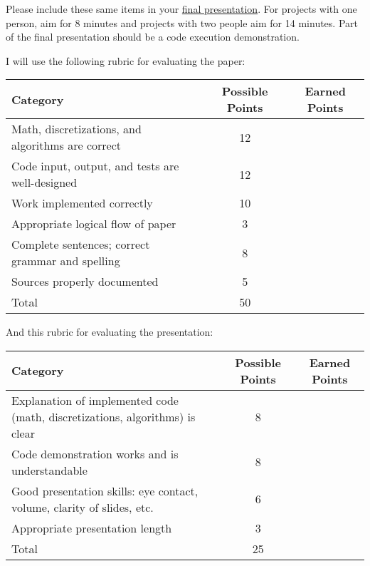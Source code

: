 \documentclass[a4paper, 12 pt]{curve}
\begin{document}
\vspace*{2em}
Please include these same items in your \underline{final presentation}. For projects with one person, aim for 8 minutes and projects with two people aim for 14 minutes. Part of the final presentation should be a code execution demonstration.

\vspace*{2 em}
I will use the following rubric for evaluating the paper:

\vspace*{1 em}
\begin{center}
\begin{tabu}{| X | c | c |}\hline
\textbf{Category} & \textbf{Possible Points} & \textbf{Earned Points} \\ \hline \hline
Math, discretizations, and algorithms are correct & 12 & \\ \hline
Code input, output, and tests are well-designed & 12 & \\ \hline
Work implemented correctly & 10 & \\ \hline
Appropriate logical flow of paper & 3 & \\ \hline
Complete sentences; correct grammar and spelling & 8 & \\ \hline
Sources properly documented & 5 & \\ \hline
Total & 50 & \\\hline
\end{tabu} 
\end{center}

And this rubric for evaluating the presentation:

\vspace*{1 em}
\begin{center}
\begin{tabu}{| X | c | c |}\hline
\textbf{Category} & \textbf{Possible Points} & \textbf{Earned Points} \\ \hline \hline
Explanation of implemented code (math, discretizations, algorithms) is clear & 8 & \\ \hline
Code demonstration works and is understandable & 8 & \\ \hline
Good presentation skills: eye contact, volume, clarity of slides, etc. & 6 & \\ \hline
Appropriate presentation length & 3 & \\ \hline
Total & 25 & \\\hline
\end{tabu} 
\end{center}
\end{document}
